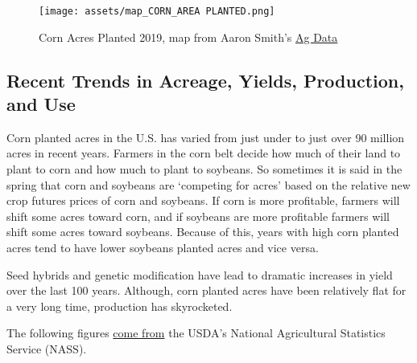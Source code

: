 \documentclass[
  letterpaper,
  DIV=11,
  numbers=noendperiod]{scrreprt}
\begin{document}
\begin{figure}

{\centering \texttt{[image: assets/map\_CORN\_AREA PLANTED.png]}

}

\caption{Corn Acres Planted 2019, map from Aaron Smith's
\href{https://asmith.ucdavis.edu/data/us-crops}{Ag Data}}

\end{figure}

\hypertarget{recent-trends-in-acreage-yields-production-and-use}{%
\subsection{Recent Trends in Acreage, Yields, Production, and
Use}\label{recent-trends-in-acreage-yields-production-and-use}}

Corn planted acres in the U.S. has varied from just under to just over
90 million acres in recent years. Farmers in the corn belt decide how
much of their land to plant to corn and how much to plant to soybeans.
So sometimes it is said in the spring that corn and soybeans are
`competing for acres' based on the relative new crop futures prices of
corn and soybeans. If corn is more profitable, farmers will shift some
acres toward corn, and if soybeans are more profitable farmers will
shift some acres toward soybeans. Because of this, years with high corn
planted acres tend to have lower soybeans planted acres and vice versa.

Seed hybrids and genetic modification have lead to dramatic increases in
yield over the last 100 years. Although, corn planted acres have been
relatively flat for a very long time, production has skyrocketed.

The following figures
\href{http://www.ers.usda.gov/topics/crops/corn/background.aspx}{come
from} the USDA's National Agricultural Statistics Service (NASS).
\end{document}
